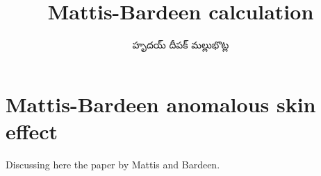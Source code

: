 \documentclass[../main.tex]{subfiles}
\title{Mattis-Bardeen calculation}
\author{\begin{telugu}హృదయ్ దీపక్ మల్లుభొట్ల\end{telugu}}
\date{}
\begin{document}
	\onlyinsubfile{\maketitle}
	\section{Mattis-Bardeen anomalous skin effect} \label{sec:MBSkinEffect}

	Discussing here the paper by Mattis and Bardeen\supercite{Mattis}.
\end{document}

